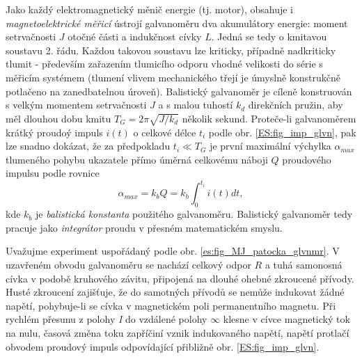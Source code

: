     Jako každý elektromagnetický měnič energie (tj. motor), obsahuje i \emph{magnetoelektrické
    měřicí} ústrojí galvanoměru dva akumulátory energie: moment setrvačnosti \(J\) otoč\-né části a
    indukčnost cívky \(L\). Jedná se tedy o kmitavou soustavu 2. řádu. Každou takovou soustavu lze
    kriticky, případně nadkriticky tlumit - především zařazením tlumicího odporu vhodné velikosti do
    série s měřicím systémem (tlumení vlivem mechanického třejí je úmyslně konstrukčně potlačeno na
    zanedbatelnou úroveň). Balistický galvanoměr je cíleně konstruován s velkým momentem
    setrvačnosti \(J\) a s malou tuhostí \(k_d\) direkčních pružin, aby měl dlouhou dobu kmitu \(T_G
    = 2\pi\sqrt{J/k_d}\) několik sekund. Proteče-li galvanoměrem krátký proudoý impuls \(i(t)\) o
    celkové délce \(t_i\) podle obr. \ref{ES:fig_imp_glvn}, pak lze snadno dokázat, že za
    předpokladu \(t_i\ll T_G\) je první maximální výchylka \(\alpha_{max}\) tlumeného pohybu
    ukazatele přímo úměrná celkovému náboji \(Q\) proudového impulsu podle rovnice 
    \begin{equation}\label{ES:eq_zakl_elm01}
      \alpha_{max} = k_b Q = k_b\int_0^{t_i} i(t)dt,
    \end{equation}
    kde \(k_b\) je \emph{balistická konstanta} použitého galvanoměru. Balistický galvanoměr tedy
    pracuje jako \emph{integrátor} proudu v přesném matematickém smyslu. 

        
    
    Uvažujme experiment uspořádaný podle obr. \ref{es:fig_MJ_patocka_glvnmr}. V uzavřeném obvodu
    galvanoměru se nachází celkový odpor \(R\) a tuhá samonosná cívka v podobě kruhového závitu,
    připojená na dlouhé ohebné zkroucené přívody. Husté zkroucení zajišťuje, že do samotných
    přívodů se nemůže indukovat žádné napětí, pohybuje-li se cívka v magnetickém poli permanentního
    magnetu. Při rychlém přesunu z polohy \emph{I} do vzdálené polohy \(\infty\) klesne v cívce
    magnetický tok na nulu, časová změna toku zapříčiní vznik indukovaného napětí, napětí protlačí
    obvodem proudový impuls odpovídající přibližně obr. \ref{ES:fig_imp_glvn}.

